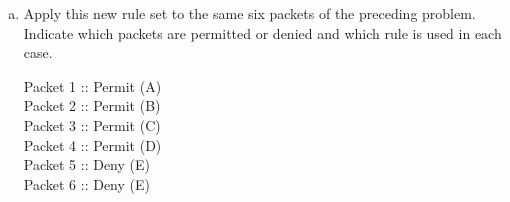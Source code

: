 \documentclass[12pt]{article}
\begin{document}
\begin{description}
\begin{enumerate}[a.]
        
        \item {\color{grey}Apply this new rule set to the same six packets of the preceding problem.  Indicate which packets are permitted or denied and which rule is used in each case.}\par
        
        Packet 1 :: Permit (A)\\
        Packet 2 :: Permit (B)\\
        Packet 3 :: Permit (C)\\
        Packet 4 :: Permit (D)\\
        Packet 5 :: Deny (E)\\
        Packet 6 :: Deny (E)\\
        
        
    \end{enumerate}
    

\end{description}
\end{document}
